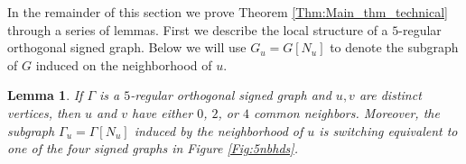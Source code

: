 \documentclass[11pt]{article}
\theoremstyle{plain}
\newtheorem{lemma}[theorem]{Lemma}
\theoremstyle{definition}
\begin{document}
In the remainder of this section we prove Theorem \ref{Thm:Main_thm_technical} through a series of lemmas. First we describe the local structure of a $5$-regular orthogonal signed graph. Below we will use $G_u=G[N_u]$ to denote the subgraph of $G$ induced on the neighborhood of $u$.

\begin{lemma} \label{Lem:k=5_Nbhd}
    If $\Gamma$ is a $5$-regular orthogonal signed graph and $u,v$ are distinct vertices, then $u$ and $v$ have either $0$, $2$, or $4$ common neighbors. Moreover, the subgraph $\Gamma_u=\Gamma[N_u]$ induced by the neighborhood of $u$ is switching equivalent to one of the four signed graphs in Figure \ref{Fig:5nbhds}.
\end{lemma}

\begin{figure}
    \centering
\end{figure}
\end{document}
